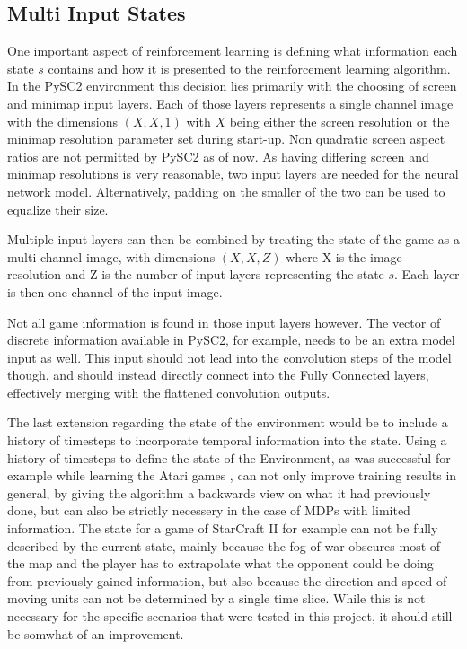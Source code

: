 \subsection{Multi Input States}
\label{sec:multistate}
One important aspect of reinforcement learning is defining what information each state $s$ contains and how it is presented to the reinforcement learning algorithm.
In the PySC2 environment this decision lies primarily with the choosing of screen and minimap input layers.
Each of those layers represents a single channel image with the dimensions $(X, X, 1)$ with $X$ being either the screen resolution or the minimap resolution parameter set during start-up. Non quadratic screen aspect ratios are not permitted by PySC2 as of now. As having differing screen and minimap resolutions is very reasonable, two input layers are needed for the neural network model. Alternatively, padding on the smaller of the two can be used to equalize their size.

Multiple input layers can then be combined by treating the state of the game as a multi-channel image, with dimensions $(X,X,Z)$ where X is the image resolution and Z is the number of input layers representing the state $s$. Each layer is then one channel of the input image.

Not all game information is found in those input layers however. The vector of discrete information available in PySC2, for example, needs to be an extra model input as well. This input should not lead into the convolution steps of the model though, and should instead directly connect into the Fully Connected layers, effectively merging with the flattened convolution outputs.

The last extension regarding the state of the environment would be to include a history of timesteps to incorporate temporal information into the state. 
Using a history of timesteps to define the state of the Environment, as was successful for example while learning the Atari games \citep{DBLP:journals/nature/MnihKSRVBGRFOPB15}, can not only improve training results in general, by giving the algorithm a backwards view on what it had previously done, but can also be strictly necessery in the case of MDPs with limited information. The state for a game of StarCraft II for example can not be fully described by the current state, mainly because the fog of war obscures most of the map and the player has to extrapolate what the opponent could be doing from previously gained information, but also because the direction and speed of moving units can not be determined by a single time slice. While this is not necessary for the specific scenarios that were tested in this project, it should still be somwhat of an improvement.

